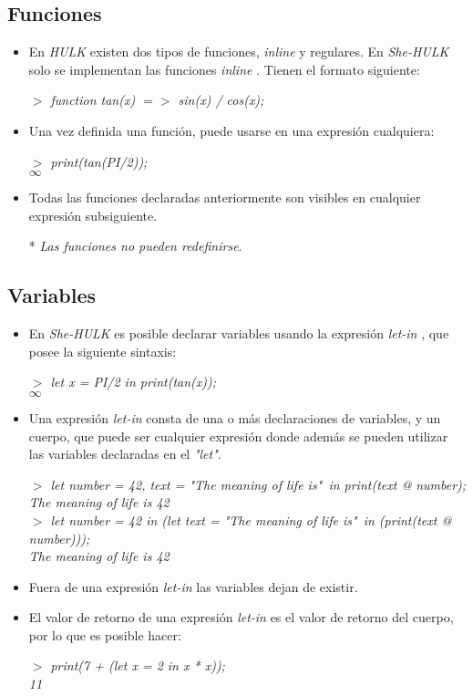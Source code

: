 \documentclass[12pt]{article}
\newcommand{\shehulk}{\emph{She-HULK} }
\newcommand{\hulk}{\emph{HULK} }
\newcommand{\ini}{$>$ }
\newcommand{\inline}{\textit{inline} }
\newcommand{\letin}{\textit{let-in} }
\begin{document}
\subsection*{Funciones}
\begin{itemize}
	\item En \hulk existen dos tipos de funciones, \inline y regulares.
	En \shehulk solo se implementan las funciones \inline.
	Tienen el formato siguiente:
	
	\emph{\ini function tan(x) $=>$ sin(x) / cos(x);}
	
	\item Una vez definida una función, puede usarse en una expresión cualquiera:
	
	\emph{
	\ini print(tan(PI/2)); \\
	$\infty$
	}
	\item Todas las funciones declaradas anteriormente son visibles en cualquier expresión subsiguiente.
	
	* \emph{Las funciones no pueden redefinirse}.
\end{itemize}
	
\subsection*{Variables}
\begin{itemize}
	\item En \shehulk es posible declarar variables usando la expresión \letin, que posee la siguiente sintaxis:
	
	\emph{
	\ini let x = PI/2 in print(tan(x)); \\
	$\infty$	
	}
	\item Una expresión \letin consta de una o más declaraciones de variables, y un cuerpo, que puede ser cualquier expresión donde además se pueden utilizar las variables declaradas en el \textit{"let"}.
	
	\emph{
	\ini let number = 42, text = "The meaning of life is"\ in print(text @ number); \\
	The meaning of life is 42 \\
	\ini let number = 42 in (let text = "The meaning of life is"\ in (print(text @ number))); \\
	The meaning of life is 42
	}
	\item Fuera de una expresión \letin las variables dejan de existir.
	\item El valor de retorno de una expresión \letin es el valor de retorno del cuerpo, por lo que es posible hacer:
	
	\emph{
	\ini print(7 + (let x = 2 in x * x)); \\
	11
	}
\end{itemize}
	
\end{document}
